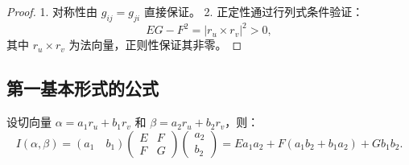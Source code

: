 \documentclass[lang=cn,10pt,thmcnt=section]{elegantbook}
\begin{document}
    \begin{proof}
    1. 对称性由 \( g_{ij} = g_{ji} \) 直接保证。  
    2. 正定性通过行列式条件验证：
    \[
    EG - F^2 = |r_u \times r_v|^2 > 0,
    \]
    其中 \( r_u \times r_v \) 为法向量，正则性保证其非零。
\end{proof}
\subsection*{第一基本形式的公式}
设切向量 \(\alpha = a_1 r_u + b_1 r_v\) 和 \(\beta = a_2 r_u + b_2 r_v\)，则：
\[
I(\alpha, \beta) = (a_1 \quad b_1) \begin{pmatrix}
E & F \\
F & G
\end{pmatrix} \begin{pmatrix}
a_2 \\
b_2
\end{pmatrix} = E a_1 a_2 + F(a_1 b_2 + b_1 a_2) + G b_1 b_2.
\]
\end{document}

